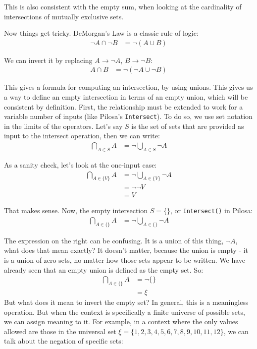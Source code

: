 \documentclass{article}
\begin{document}
This is also consistent with the empty sum, when looking at the cardinality of intersections of mutually exclusive sets.

Now things get tricky. DeMorgan's Law is a classic rule of logic:
\begin{align}
\neg A \cap \neg B &= \neg ( A \cup B )
\end{align}

We can invert it by replacing $A \to \neg A$, $B \to \neg B$:
\begin{align}  \label{eq:demorgan-neg}
A \cap B &= \neg ( \neg A \cup \neg B )
\end{align}

This gives a formula for computing an intersection, by using unions. This gives us a way to define an empty intersection in terms of an empty union, which will be consistent by definition. First, the relationship must be extended to work for a variable number of inputs (like Pilosa's \texttt{Intersect}). To do so, we use set notation in the limits of the operators. Let's say $S$ is the set of sets that are provided as input to the intersect operation, then we can write:
\begin{align} 
\bigcap\limits_{A \in S} A &= \neg \bigcup\limits_{A \in S} \neg A
\end{align}

As a sanity check, let's look at the one-input case:
\begin{align} 
\bigcap\limits_{A \in \{V\}} A &= \neg \bigcup\limits_{A \in \{V\}} \neg A\\
&= \neg \neg V\\
&= V
\end{align}

That makes sense. Now, the empty intersection $S = \{\}$, or \texttt{Intersect()} in Pilosa:
\begin{align} 
\bigcap\limits_{A \in \{\}} A &= \neg \bigcup\limits_{A \in \{\}} \neg A
\end{align}

The expression on the right can be confusing. It is a union of this thing, $\neg A$, what does that mean exactly? It doesn't matter, because the union is empty - it is a union of zero sets, no matter how those sets appear to be written. We have already seen that an empty union is defined as the empty set. So:
\begin{align} 
\bigcap\limits_{A \in \{\}} A &= \neg \{\}\\
&= \xi
\end{align}
But what does it mean to invert the empty set? In general, this is a meaningless operation. But when the context is specifically a finite universe of possible sets, we can assign meaning to it. For example, in a context where the only values allowed are those in the universal set $\xi = \{1, 2, 3, 4, 5, 6, 7, 8, 9, 10, 11, 12\}$, we can talk about the negation of specific sets:
\end{document}
